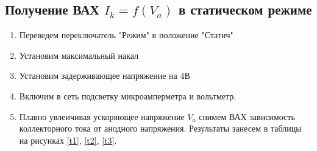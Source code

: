 \documentclass[a4paper]{article}
\begin{document}
\subsection{Получение ВАХ $I_k = f(V_a)$ в статическом режиме}

\begin{enumerate}
	\item Переведем переключатель "Режим" в положение "Статич"
	\item Установим максимальный накал 
	\item Установим задерживающее напряжение на 4В
	\item Включим в сеть подсветку микроамперметра и вольтметр. 
	\item Плавно увлеичивая ускоряющее напряжение $V_a$ снимем ВАХ зависимость коллекторного тока от 
	анодного напряжения. Результаты занесем в таблицы на рисунках \ref{t1}, \ref{t2}, \ref{t3}.


\newpage


\end{enumerate}
\end{document}
